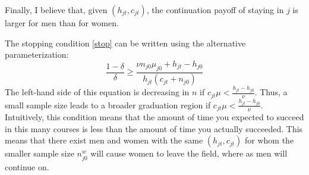 \documentclass[10 pt]{article}
\newcommand{\nobib}[1]{}
\newcommand{\nobib}[1]{#1}
\begin{document}
\begin{outline}
\begin{blist}
\item Finally, I believe that, given $(h_{jt}, c_{jt})$, the continuation payoff of staying in $j$ is larger for men than for women. 

\end{blist}



The stopping condition \eqref{stop} can be written using the alternative parameterization: 
\begin{equation*}
	\frac{1- \delta}{\delta} \geq 
	\frac{\nu n_{j0} \mu_{j0} + h_{jt} - h_{j0}}{h_{jt}(c_{jt} + n_{j0})}
\end{equation*}
The left-hand side of this equation is decreasing in $n$ if $c_{jt} \mu < \frac{h_{jt} - h_{j0}}{\nu}$. 
Thus, a small sample size leads to a broader graduation region if $c_{jt} \mu < \frac{h_{jt} - h_{j0}}{\nu}$.
Intuitively, this condition means that the amount of time you expected to succeed in this many courses is less than the amount of time you actually succeeded. 
This means that there exist men and women with the same $(h_{jt}, c_{jt})$ for whom the smaller sample size $n_{j0}^w$ will cause women to leave the field, where as men will continue on. 


\end{outline}








\nobib{\printbibliography}
\end{document}
